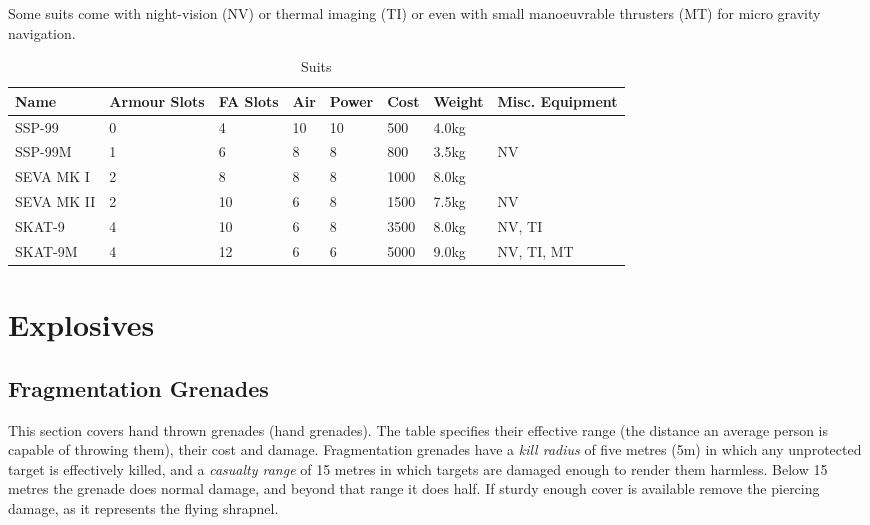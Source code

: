 Some suits come with night-vision (NV) or thermal imaging (TI) or even with
small manoeuvrable thrusters (MT) for micro gravity navigation.

\begin{table}
  \caption{Suits}
  \label{tab:Suits}
  \begin{center}
    \begin{tabular}{| l | l | l | l | l | l | l | l |}

      \hline
      \textbf{Name} & \textbf{Armour Slots} & \textbf{FA Slots} &
      \textbf{Air} & \textbf{Power} & \textbf{Cost} & \textbf{Weight} &
      \textbf{Misc. Equipment} \\ \hline

      SSP-99     & 0 &  4 & 10 & 10 &  500 & 4.0kg & \\ \hline
      SSP-99M    & 1 &  6 &  8 &  8 &  800 & 3.5kg & NV \\ \hline

      SEVA MK I  & 2 &  8 &  8 &  8 & 1000 & 8.0kg & \\ \hline
      SEVA MK II & 2 & 10 &  6 &  8 & 1500 & 7.5kg & NV \\ \hline

      SKAT-9     & 4 & 10 &  6 &  8 & 3500 & 8.0kg & NV, TI \\ \hline
      SKAT-9M    & 4 & 12 &  6 &  6 & 5000 & 9.0kg & NV, TI, MT \\ \hline

    \end{tabular}
  \end{center}
\end{table}


\section{Explosives}
\label{sec:10-Explosives}

\subsection{Fragmentation Grenades}
\label{sub:10-Fragmentation Grenades}

This section covers hand thrown grenades (hand grenades). The table specifies
their effective range (the distance an average person is capable of throwing
them), their cost and damage. Fragmentation grenades have a \emph{kill radius}
of five metres (5m) in which any unprotected target is effectively killed, and
a \emph{casualty range} of 15 metres in which targets are damaged enough to
render them harmless. Below 15 metres the grenade does normal damage, and
beyond that range it does half. If sturdy enough cover is available remove
the piercing damage, as it represents the flying shrapnel.

